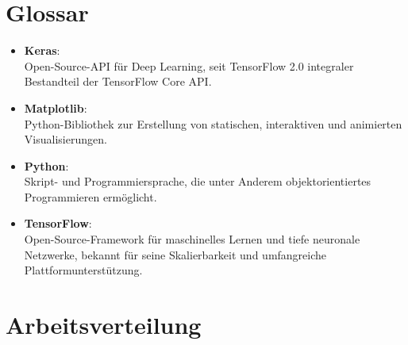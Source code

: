 
\nocite{*}						%
\cleardoublepage

\listoffigures
{}   %
\cleardoublepage

\listoftables
{}		%
\cleardoublepage

\lstlistoflistings
{}%
\cleardoublepage

\chapter*{Glossar}

\begin{itemize}
	\item \textbf{Keras}:\\ Open-Source-API für Deep Learning, seit TensorFlow 2.0 integraler Bestandteil der TensorFlow Core API.
	\item \textbf{Matplotlib}: \\  Python-Bibliothek zur Erstellung von statischen, interaktiven und animierten Visualisierungen.
	\item \textbf{Python}:\\ Skript- und Programmiersprache, die unter Anderem objektorientiertes Programmieren ermöglicht. 
	\item \textbf{TensorFlow}:\\  Open-Source-Framework für maschinelles Lernen und tiefe neuronale Netzwerke, bekannt für seine Skalierbarkeit und umfangreiche Plattformunterstützung.
\end{itemize} 

\chapter*{Arbeitsverteilung}

